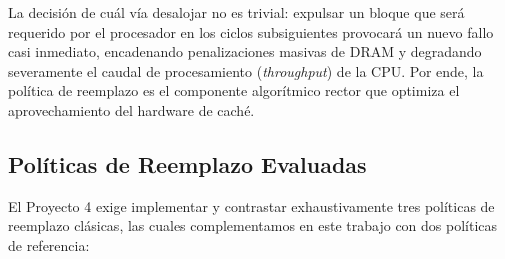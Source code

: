 \documentclass[11pt,letterpaper]{article}
\begin{document}
La decisión de cuál vía desalojar no es trivial: expulsar un bloque que será requerido por el procesador en los ciclos subsiguientes provocará un nuevo fallo casi inmediato, encadenando penalizaciones masivas de DRAM y degradando severamente el caudal de procesamiento (\textit{throughput}) de la CPU. Por ende, la política de reemplazo es el componente algorítmico rector que optimiza el aprovechamiento del hardware de caché.

\subsection{Políticas de Reemplazo Evaluadas}
El Proyecto 4 exige implementar y contrastar exhaustivamente tres políticas de reemplazo clásicas, las cuales complementamos en este trabajo con dos políticas de referencia:
\end{document}
